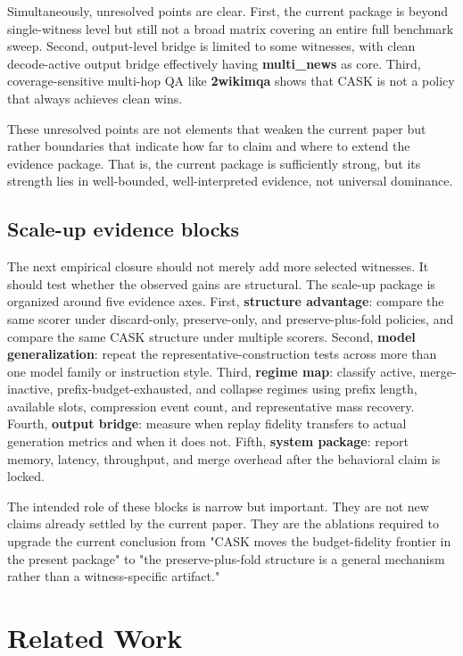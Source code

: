 Simultaneously, unresolved points are clear. First, the current package is beyond single-witness level but still not a broad matrix covering an entire full benchmark sweep. Second, output-level bridge is limited to some witnesses, with clean decode-active output bridge effectively having \textbf{multi\_news} as core. Third, coverage-sensitive multi-hop QA like \textbf{2wikimqa} shows that CASK is not a policy that always achieves clean wins.


These unresolved points are not elements that weaken the current paper but rather boundaries that indicate how far to claim and where to extend the evidence package. That is, the current package is sufficiently strong, but its strength lies in well-bounded, well-interpreted evidence, not universal dominance.


\subsection{Scale-up evidence blocks}


The next empirical closure should not merely add more selected witnesses. It should test whether the observed gains are structural. The scale-up package is organized around five evidence axes. First, \textbf{structure advantage}: compare the same scorer under discard-only, preserve-only, and preserve-plus-fold policies, and compare the same CASK structure under multiple scorers. Second, \textbf{model generalization}: repeat the representative-construction tests across more than one model family or instruction style. Third, \textbf{regime map}: classify active, merge-inactive, prefix-budget-exhausted, and collapse regimes using prefix length, available slots, compression event count, and representative mass recovery. Fourth, \textbf{output bridge}: measure when replay fidelity transfers to actual generation metrics and when it does not. Fifth, \textbf{system package}: report memory, latency, throughput, and merge overhead after the behavioral claim is locked.


The intended role of these blocks is narrow but important. They are not new claims already settled by the current paper. They are the ablations required to upgrade the current conclusion from "CASK moves the budget-fidelity frontier in the present package" to "the preserve-plus-fold structure is a general mechanism rather than a witness-specific artifact."


\section{Related Work}


